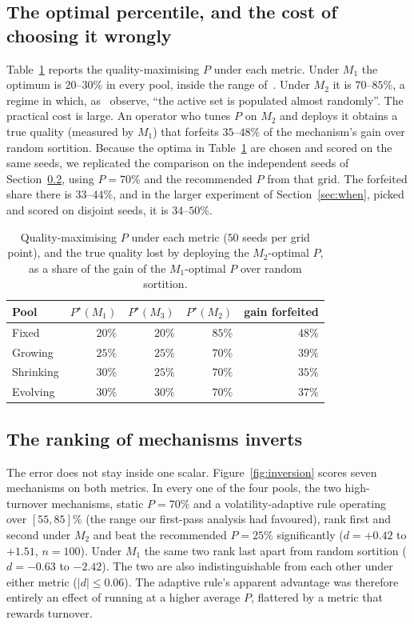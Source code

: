 \documentclass[sigconf,anonymous,review,nonacm]{acmart}
\begin{document}
\subsection{The optimal percentile, and the cost of choosing it wrongly}
Table~\ref{tab:pstar} reports the quality-maximising $P$ under each metric. Under $M_1$ the
optimum is $20$--$30\%$ in every pool, inside the range of~\cite{kruijssen2024}. Under $M_2$
it is $70$--$85\%$, a regime in which, as~\cite{kruijssen2024} observe, ``the active set is
populated almost randomly''. The practical cost is large. An operator who tunes $P$ on $M_2$
and deploys it obtains a true quality (measured by $M_1$) that forfeits $35$--$48\%$ of the
mechanism's gain over random sortition. Because the optima in Table~\ref{tab:pstar} are
chosen and scored on the same seeds, we replicated the comparison on the independent seeds
of Section~\ref{sec:inversion}, using $P=70\%$ and the recommended $P$ from that grid.
The forfeited share there is $33$--$44\%$, and in the larger experiment of
Section~\ref{sec:when}, picked and scored on disjoint seeds, it is $34$--$50\%$.

\begin{table}[t]\centering\small
\caption{Quality-maximising $P$ under each metric ($50$ seeds per grid point), and the true
quality lost by deploying the $M_2$-optimal $P$, as a share of the gain of the $M_1$-optimal
$P$ over random sortition.}
\label{tab:pstar}
\begin{tabular}{lrrrr}
\toprule
Pool & $P^\star(M_1)$ & $P^\star(M_3)$ & $P^\star(M_2)$ & gain forfeited\\
\midrule
Fixed     & $20\%$ & $20\%$ & $85\%$ & $48\%$\\
Growing   & $25\%$ & $25\%$ & $70\%$ & $39\%$\\
Shrinking & $30\%$ & $25\%$ & $70\%$ & $35\%$\\
Evolving  & $30\%$ & $30\%$ & $70\%$ & $37\%$\\
\bottomrule
\end{tabular}
\end{table}

\subsection{The ranking of mechanisms inverts}
\label{sec:inversion}
The error does not stay inside one scalar. Figure~\ref{fig:inversion} scores seven
mechanisms on both metrics. In every one of the four pools, the two high-turnover
mechanisms, static $P=70\%$ and a volatility-adaptive rule operating over $[55,85]\%$ (the
range our first-pass analysis had favoured), rank first and second under $M_2$ and beat
the recommended $P=25\%$ significantly ($d=+0.42$ to $+1.51$, $n=100$). Under $M_1$ the same
two rank last apart from random sortition ($d=-0.63$ to $-2.42$). The two are also
indistinguishable from each other under either metric ($|d|\le0.06$). The adaptive rule's
apparent advantage was therefore entirely an effect of running at a higher average $P$,
flattered by a metric that rewards turnover.
\end{document}
